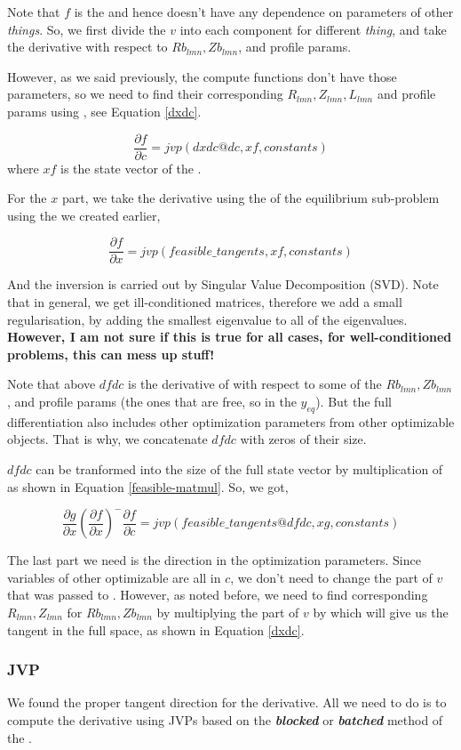 Note that $f$ is the  and hence doesn't have any dependence on parameters of other \textit{things}. So, we first divide the $v$ into each component for different \textit{thing}, and take the derivative with respect to $Rb_{lmn}, Zb_{lmn}$, and profile params. 

However, as we said previously, the compute functions don't have those parameters, so we need to find their corresponding $R_{lmn}, Z_{lmn}, L_{lmn}$ and profile params using , see Equation \ref{dxdc}.

\begin{equation}
    \frac{\partial f}{\partial c} = jvp(dxdc@dc, xf, constants)
\end{equation}
where $xf$ is the state vector of the .

For the $x$ part, we take the derivative using the  of the equilibrium sub-problem using the  we created earlier,

\begin{equation}
    \frac{\partial f}{\partial x} = jvp(feasible\_tangents, xf, constants)
\end{equation}

And the inversion is carried out by Singular Value Decomposition (SVD). Note that in general, we get ill-conditioned matrices, therefore we add a small regularisation, by adding the smallest eigenvalue to all of the eigenvalues. \textbf{However, I am not sure if this is true for all cases, for well-conditioned problems, this can mess up stuff!}

Note that above $dfdc$ is the derivative of  with respect to some of the $Rb_{lmn}, Zb_{lmn}$, and profile params (the ones that are free, so in the $y_{eq}$). But the full differentiation also includes other optimization parameters from other optimizable objects. That is why, we concatenate $dfdc$ with zeros of their size.

$dfdc$ can be tranformed into the size of the full state vector by multiplication of  as shown in Equation \ref{feasible-matmul}. So, we got,

\begin{equation}
    \frac{\partial g}{\partial x}\left( \frac{\partial f}{\partial x} \right) ^{-} \frac{\partial f}{\partial c} = jvp(feasible\_tangents @ dfdc, xg, constants)
\end{equation}

The last part we need is the direction in the optimization parameters. Since variables of other optimizable are all in $c$, we don't need to change the part of $v$ that was passed to . However, as noted before, we need to find corresponding $R_{lmn}, Z_{lmn}$ for $Rb_{lmn}, Zb_{lmn}$ by multiplying the  part of $v$ by  which will give us the tangent in the full space, as shown in Equation \ref{dxdc}.

\subsubsection{JVP}
We found the proper tangent direction for the derivative. All we need to do is to compute the derivative using JVPs based on the \textbf{\textit{blocked}} or \textbf{\textit{batched}} method of the .